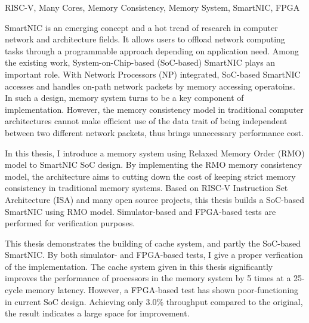 \documentclass[supercite,notofont,hustthesis]{HustGraduPaper}
\begin{document}
\begin{enabstract}{RISC-V, Many Cores, Memory Consistency, Memory System, SmartNIC, FPGA}

SmartNIC is an emerging concept and a hot trend of research in computer network
and architecture fields. It allows users to offload network computing tasks
through a programmable approach depending on application need. Among the
existing work, System-on-Chip-based (SoC-based) SmartNIC plays an important
role. With Network Processors (NP) integrated, SoC-based SmartNIC accesses and
handles on-path network packets by memory accessing operatoins. In such a
design, memory system turns to be a key component of implementation. However,
the memory consistency model in traditional computer architectures cannot make
efficient use of the data trait of being independent between two different
network packets, thus brings unnecessary performance cost.

In this thesis, I introduce a memory system using Relaxed Memory Order (RMO)
model to SmartNIC SoC design. By implementing the RMO memory consistency model,
the architecture aims to cutting down the cost of keeping strict memory
consistency in traditional memory systems. Based on RISC-V Instruction Set
Architecture (ISA) and many open source projects, this thesis builds a SoC-based
SmartNIC using RMO model. Simulator-based and FPGA-based tests are performed for
verification purposes.

This thesis demonstrates the building of cache system, and partly the SoC-based
SmartNIC. By both simulator- and FPGA-based tests, I give a proper verfication
of the implementation. The cache system given in this thesis significantly
improves the performance of processors in the memory system by 5 times at a
25-cycle memory latency. However, a FPGA-based test has shown poor-functioning
in current SoC design. Achieving only 3.0\% throughput compared to the original,
the result indicates a large space for improvement.

\end{enabstract}

\tableofcontents[level=2]

\clearpage








\end{document}
